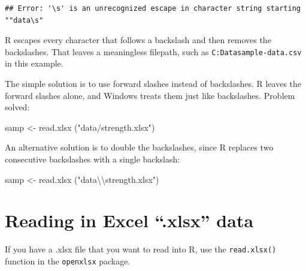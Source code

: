 \documentclass[
]{book}
\newenvironment{Shaded}{\begin{snugshade}}{\end{snugshade}}
\newcommand{\FunctionTok}[1]{\textcolor[rgb]{0.00,0.00,0.00}{#1}}
\newcommand{\NormalTok}[1]{#1}
\newcommand{\OtherTok}[1]{\textcolor[rgb]{0.56,0.35,0.01}{#1}}
\newcommand{\SpecialCharTok}[1]{\textcolor[rgb]{0.00,0.00,0.00}{#1}}
\newcommand{\StringTok}[1]{\textcolor[rgb]{0.31,0.60,0.02}{#1}}
\begin{document}
\begin{verbatim}
## Error: '\s' is an unrecognized escape in character string starting ""data\s"
\end{verbatim}

R escapes every character that follows a backslash and then removes the backslashes. That leaves a meaningless filepath, such as
\texttt{C:Datasample-data.csv} in this example.

The simple solution is to use forward slashes instead of backslashes. R leaves the forward slashes alone, and Windows treats them just like backslashes. Problem solved:

\begin{Shaded}
\begin{Highlighting}[]
\NormalTok{samp }\OtherTok{\textless{}{-}} \FunctionTok{read.xlsx}\NormalTok{ (}\StringTok{"data/strength.xlsx"}\NormalTok{)}
\end{Highlighting}
\end{Shaded}

An alternative solution is to double the backslashes, since R replaces two consecutive backslashes with a single backslash:

\begin{Shaded}
\begin{Highlighting}[]
\NormalTok{samp }\OtherTok{\textless{}{-}} \FunctionTok{read.xlsx}\NormalTok{ (}\StringTok{"data}\SpecialCharTok{\textbackslash{}\textbackslash{}}\StringTok{strength.xlsx"}\NormalTok{)}
\end{Highlighting}
\end{Shaded}

\hypertarget{INPUT-IMPORT}{%
\section{Reading in Excel ``.xlsx'' data}\label{INPUT-IMPORT}}

If you have a .xlsx file that you want to read into R, use the \texttt{read.xlsx()} function in the \texttt{openxlsx} package.
\end{document}
